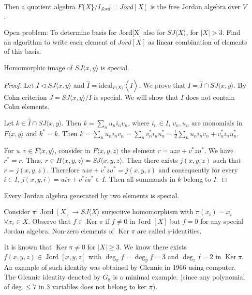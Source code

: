 \documentclass{article}
\def\<{\mathop{\langle}}
\def\>{\mathop{\rangle}}
\begin{document}
Then a quotient algebra $F\{X\} / I_{Jord} = Jord [X]$ is the free Jordan algebra over $V$.  

Open problem: To determine basis for Jord[X] also for $SJ \langle X \rangle$, for $|X| > 3$. Find an algorithm to write each element of $Jord[X]$ as linear combination of elements of this basis.  

\begin{theorem}[Cohn] 
Homomorphic image of $SJ\langle x,y \rangle$ is special.
\end{theorem}

\begin{proof} 
Let $I \triangleleft SJ\langle x,y \rangle$ and $\hat{I} = \text{ideal}_{F\langle X \rangle} \< I\>$. We prove that $I = \hat{I} \cap SJ\langle x,y \rangle $. By Cohn criterion $J =SJ\langle x,y \rangle / I$ is special. We will show that $I$ does not contain Cohn elements.

Let $k \in \hat{I} \cap SJ \langle x, y \rangle$. Then $k = \sum_n u_n i_n v_n$, where $i_n \in I$, $v_n, u_n$ are monomials in $F\langle x, y \rangle$ and $k^* = k$. Then  
$k = \sum_n u_n i_n v_n = \sum_n v_n^* i_n u_n^* = \frac{1}{2} \sum_n u_n i_n v_n + v_n^* i_n u_n^*$.  

For $u, v \in F \langle x, y \rangle$, consider in $F \langle x, y, z \rangle$ the element $r = uzv + v^* zu^*$. We have $r^* = r$.  
Thus, $r \in H \langle x, y, z \rangle = SJ \langle x, y, z \rangle$. Then there exists $j(x, y, z)$ such that $r = j(x, y, z)$. Therefore $uzv + v^* zu^* = j(x, y, z)$ and consequently for every $i \in I$, $j(x, y, i) = ui v + v^* i u^* \in I$. Then all summands in $k$ belong to $I$.  
\end{proof}

\begin{theorem} 
Every Jordan algebra generated by two elements is special. 
\end{theorem}

Consider $\pi$: Jord $[X] \to SJ \langle X \rangle$ surjective homomorphism with $\pi(x_i) = x_i$ $\forall x_i \in X$.  
Observe that $f \in \operatorname{Ker} \pi$ if $f \neq 0$ in Jord $[X]$ but $f = 0$ for any special Jordan algebra. Non-zero elements of $\operatorname{Ker} \pi$ are called s-identities.  

It is known that $\operatorname{Ker} \pi \neq 0$ for $|X| \ge 3$.  
We know there exists $f(x, y, z) \in \operatorname{Jord} [x, y, z]$ with $\deg_x f = \deg_y f = 3$ and $\deg_z f = 2$ in $\operatorname{Ker} \pi$. An example of such identity was obtained by Glennie in 1966 using computer. The Glennie identity denoted by $G_8$ is a minimal example. (since any polynomial of deg $\le 7$ in 3 variables does not belong to ker $\pi$).  
\end{document}
